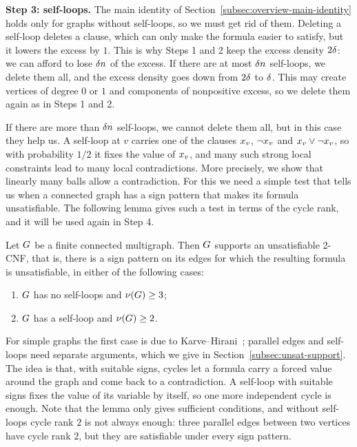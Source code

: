 \medskip
\noindent\textbf{Step 3: self-loops.} The main identity of
Section~\ref{subsec:overview-main-identity} holds only for graphs without
self-loops, so we must get rid of them. Deleting a self-loop deletes a clause,
which can only make the formula easier to satisfy, but it lowers the excess by
\(1\). This is why Steps 1 and 2 keep the excess density \(2\delta\): we can
afford to lose \(\delta n\) of the excess. If there are at most
\(\delta n\) self-loops, we delete them all, and the excess density goes down
from \(2\delta\) to \(\delta\). This may create vertices of degree \(0\) or \(1\)
and components of nonpositive excess, so we delete them again as in Steps 1
and 2.

If there are more than \(\delta n\) self-loops, we cannot delete them all,
but in this case they help us. A self-loop at \(v\) carries one of the clauses
\(x_{v}\), \(\neg x_{v}\) and \(x_{v}\vee\neg x_{v}\), so with
probability \(1/2\) it fixes the value of \(x_{v}\), and many such strong
local constraints lead to many local contradictions. More precisely, we show
that linearly many balls allow a contradiction. For this we need a simple test
that tells us when a connected graph has a sign pattern that makes its formula
unsatisfiable. The following lemma gives such a test in terms of the cycle
rank, and it will be used again in Step 4.

\begin{lemma}\label{lem:overview-unsat-support}
Let \(G\) be a finite connected multigraph. Then \(G\) supports an
unsatisfiable 2-CNF, that is, there is a sign pattern on its edges for which
the resulting formula is unsatisfiable, in either of the following cases:
\begin{enumerate}[label=(\arabic*),leftmargin=3em]
\item \(G\) has no self-loops and \(\nu(G)\ge3\);
\item \(G\) has a self-loop and \(\nu(G)\ge2\).
\end{enumerate}
\end{lemma}

For simple graphs the first case is due to Karve--Hirani~\cite[Corollary
19]{KarveHirani2019}; parallel edges and self-loops need separate arguments,
which we give in Section~\ref{subsec:unsat-support}. The idea is that, with
suitable signs, cycles let a formula carry a forced value around the graph and
come back to a contradiction. A self-loop with suitable signs fixes the value
of its variable by itself, so one more independent cycle is enough. Note that
the lemma only gives sufficient conditions, and without self-loops cycle rank
\(2\) is not always enough: three parallel edges between two vertices have
cycle rank \(2\), but they are satisfiable under every sign pattern.

